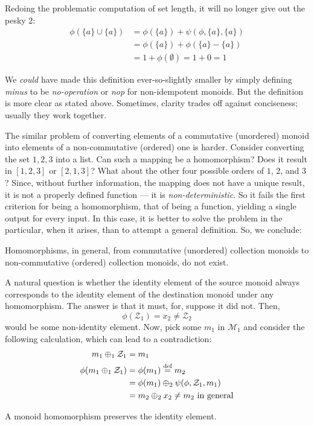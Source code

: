 Redoing the problematic computation of set length, it will no longer give out the pesky $2$:
\begin{align*}
  \phi\left(\{a\}\cup\{a\}\right) 
  &= \phi\left(\{a\}\right)+\psi\left(\phi,\{a\},\{a\}\right)\\
  &= \phi\left(\{a\}\right)+\phi\left(\{a\}-\{a\}\right) \\
  &= 1 + \phi\left(\emptyset\right)=1+0=1
\end{align*}


We \emph{could} have made this definition ever-so-slightly smaller by simply defining \emph{minus} to be \emph{no-operation} or \emph{nop} for non-idempotent monoids. But the definition is more clear as stated above. Sometimes, clarity trades off against conciseness; usually they work together. 


The similar problem of converting elements of a commutative (unordered) monoid into elements of a non-commutative (ordered) one is harder. Consider converting the set ${1,2,3}$ into a list. Can such a mapping be a homomorphism? Does it result in $[1,2,3]$ or $[2,1,3]$? What about the other four possible orders of $1$, $2$, and $3$? Since, without further information, the mapping does not have a unique result, it is not a properly defined function --- it is \emph{non-deterministic}. So it fails the first criterion for being a homomorphism, that of being a function, yielding a single output for every input. In this case, it is better to solve the problem in the particular, when it arises, than to attempt a general definition. So, we conclude:


\begin{observation}
Homomorphisms, in general, from commutative (unordered) collection monoids to non-commutative (ordered) collection monoids, do not exist.
\end{observation}


A natural question is whether the identity element of the source monoid always corresponds to the identity element of the destination monoid under any homomorphism. The answer is that it must, for, suppose it did not. Then, 
\[
  \phi(\mathcal{Z}_{1}) = x_2 \neq \mathcal{Z}_{2}
\]
would be some non-identity element. Now, pick some $m_1$ in $\mathcal{M}_1$ and consider the following calculation, which can lead to a contradiction:
\begin{align*}
  m_1 \oplus_1 \mathcal{Z}_1       &= m_1                   \\
  \phi(m_1 \oplus_1 \mathcal{Z}_1) &= \phi(m_1) \overset{\text{def}}{=} m_2  \\
  {} &= \phi(m_1) \oplus_2 \psi(\phi,\mathcal{Z}_1,m_1) \\
  {} &= m_2 \oplus_2 x_2 \neq m_2 \text{ in general}
\end{align*}
\begin{lemma}
  A monoid homomorphism preserves the identity element.
\end{lemma}


